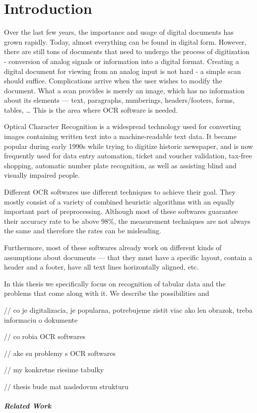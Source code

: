 \chapter*{Introduction}

Over the last few years, the importance and usage of digital documents has grown rapidly. Today, almost everything can be found in digital form. However, there are still tons of documents that need to undergo the process of digitization - conversion of analog signals or information into a digital format. Creating a digital document for viewing from an analog input is not hard - a simple scan should suffice. Complications arrive when the user wishes to modify the document. What a scan provides is merely an image, which has no information about its elements --- text, paragraphs, numberings, headers/footers, forms, tables, \dots {} This is the area where OCR software is needed.

Optical Character Recognition is a widespread technology used for converting images containing written text into a machine-readable text data. It became popular during early 1990s while trying to digitize historic newspaper, and is now frequently used for data entry automation, ticket and voucher validation, tax-free shopping, automatic number plate recognition, as well as assisting blind and visually impaired people.

Different OCR softwares use different techniques to achieve their goal. They mostly consist of a variety of combined heuristic algorithms with an equally important part of preprocessing. Although most of these softwares guarantee  their accuracy rate to be above 98\%, the measurement techniques are not always the same and therefore the rates can be misleading.

Furthermore, most of these softwares already work on different kinds of assumptions about documents --- that they must have a specific layout, contain a header and a footer, have all text lines horizontally aligned, etc.

In this thesis we specifically focus on recognition of tabular data and the problems that come along with it. We describe the possibilities and 



// co je digitalizacia, je popularna, potrebujeme zistit viac ako len obrazok, treba informaciu o dokumente


// co robia OCR softwares


// ake su problemy s OCR softwares


// my konkretne riesime tabulky


// thesis bude mat nasledovnu strukturu


\paragraph{Related Work}
